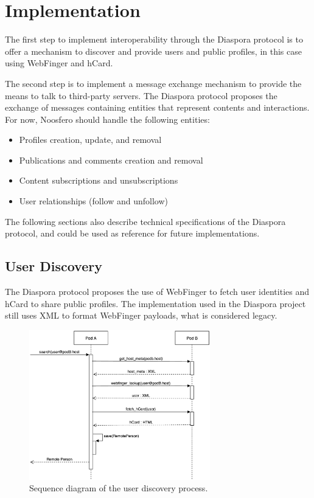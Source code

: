 \chapter{Implementation}
\label{chapter:5}

The first step to implement interoperability through the Diaspora
protocol is to offer a mechanism to discover and provide users and
public profiles, in this case using WebFinger and hCard.

The second step is to implement a message exchange mechanism to provide
the means to talk to third-party servers. The Diaspora protocol proposes
the exchange of messages containing entities that represent contents and
interactions. For now, Noosfero should handle the following entities:

\begin{itemize}
  \item Profiles creation, update, and removal
  \item Publications and comments creation and removal
  \item Content subscriptions and unsubscriptions
  \item User relationships (follow and unfollow)
\end{itemize}

The following sections also describe technical specifications of the
Diaspora protocol, and could be used as reference for future
implementations.

\section{User Discovery}

The Diaspora protocol proposes the use of WebFinger to fetch user
identities and hCard to share public profiles. The implementation used
in the Diaspora project still uses XML to format WebFinger payloads,
what is considered legacy.

\begin{figure}[h]
	\centering
		\includegraphics[width=0.7\textwidth]{figures/seq_descoberta.eps}
	\caption{Sequence diagram of the user discovery process.}
	\label{fig:seq_discovery}
\end{figure}

